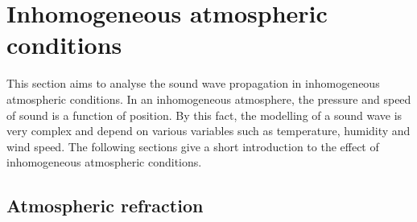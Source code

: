  
\section{Inhomogeneous atmospheric conditions}\label{sec:ana:inhom_ats_con}
This section aims to analyse the sound wave propagation in inhomogeneous atmospheric conditions. In an inhomogeneous atmosphere, the pressure and speed of sound is a function of position. By this fact, the modelling of a sound wave is very complex and depend on various variables such as temperature, humidity and wind speed. The following sections give a short introduction to the effect of inhomogeneous atmospheric conditions. 
 
 
\subsection{Atmospheric refraction} \label{sec:ana:atm_ref}


